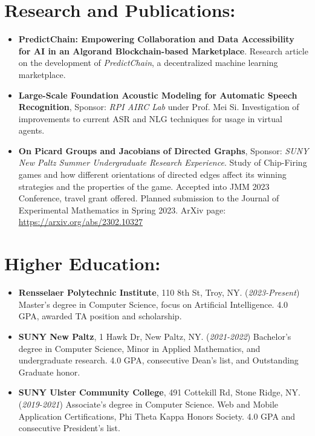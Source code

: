 \section*{Research and Publications:}
\begin{itemize}
    \itemsep0em
    \item \textbf{PredictChain: Empowering Collaboration and Data Accessibility for AI in an Algorand Blockchain-based Marketplace}.  Research article on the development of \textit{PredictChain}, a decentralized machine learning marketplace.
    \item \textbf{Large-Scale Foundation Acoustic Modeling for Automatic Speech Recognition}, Sponsor: \textit{RPI AIRC Lab} under Prof. Mei Si. Investigation of improvements to current ASR and NLG techniques for usage in virtual agents.

    \item \textbf{On Picard Groups and Jacobians of Directed Graphs}, Sponsor: \textit{SUNY New Paltz Summer Undergraduate Research Experience}. Study of Chip-Firing games and how different orientations of directed edges affect its winning strategies and the properties of the game.  Accepted into JMM 2023 Conference, travel grant offered.  Planned submission to the Journal of Experimental Mathematics in Spring 2023. ArXiv page: \href{https://arxiv.org/abs/2302.10327}{https://arxiv.org/abs/2302.10327}
    
\end{itemize}

\section*{Higher Education:}
\begin{itemize}
    \itemsep0em
    \item \textbf{Rensselaer Polytechnic Institute}, 110 8th St, Troy, NY. (\textit{2023-Present}) Master's degree in Computer Science, focus on Artificial Intelligence.  4.0 GPA, awarded TA position and scholarship.
    \item \textbf{SUNY New Paltz}, 1 Hawk Dr, New Paltz, NY. (\textit{2021-2022}) Bachelor's degree in Computer Science, Minor in Applied Mathematics, and undergraduate research. 4.0 GPA, consecutive Dean's list, and Outstanding Graduate honor.
    \item \textbf{SUNY Ulster Community College}, 491 Cottekill Rd, Stone Ridge, NY. (\textit{2019-2021}) Associate's degree in Computer Science. Web and Mobile Application Certifications, Phi Theta Kappa Honors Society. 4.0 GPA and consecutive President's list.
\end{itemize}

